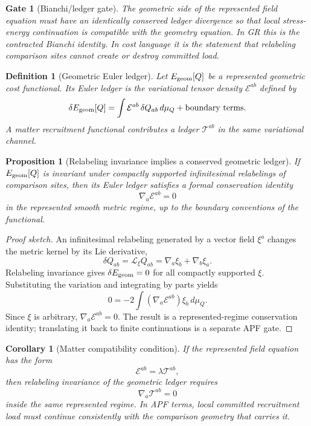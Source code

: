 \documentclass[11pt]{article}
\newtheorem{proposition}[theorem]{Proposition}
\newtheorem{corollary}[theorem]{Corollary}
\newtheorem{definition}[theorem]{Definition}
\newtheorem{gate}[theorem]{Gate}
\theoremstyle{remark}
\newcommand{\Egeom}{E_{\rm geom}}
\newcommand{\Lie}{\mathcal L}
\begin{document}
\begin{gate}[Bianchi/ledger gate]
The geometric side of the represented field equation must have an identically conserved ledger divergence so that local stress-energy continuation is compatible with the geometry equation.  In GR this is the contracted Bianchi identity.  In cost language it is the statement that relabeling comparison sites cannot create or destroy committed load.
\end{gate}


\begin{definition}[Geometric Euler ledger]
Let \(\Egeom[Q]\) be a represented geometric cost functional.  Its Euler ledger is the variational tensor density \(\mathcal E^{ab}\) defined by
\[
        \delta \Egeom[Q]
        =\int \mathcal E^{ab}\,\delta Q_{ab}\,d\mu_Q
        +\text{boundary terms}.
\]
A matter recruitment functional contributes a ledger \(\mathcal T^{ab}\) in the same variational channel.
\end{definition}

\begin{proposition}[Relabeling invariance implies a conserved geometric ledger]
\label{prop:ledger-identity}
If \(\Egeom[Q]\) is invariant under compactly supported infinitesimal relabelings of comparison sites, then its Euler ledger satisfies a formal conservation identity
\[
        \nabla_a\mathcal E^{ab}=0
\]
in the represented smooth metric regime, up to the boundary conventions of the functional.
\end{proposition}

\begin{proof}[Proof sketch]
An infinitesimal relabeling generated by a vector field \(\xi^a\) changes the metric kernel by its Lie derivative,
\[
        \delta Q_{ab}=\Lie_\xi Q_{ab}=\nabla_a\xi_b+\nabla_b\xi_a.
\]
Relabeling invariance gives \(\delta\Egeom=0\) for all compactly supported \(\xi\).  Substituting the variation and integrating by parts yields
\[
        0=-2\int (\nabla_a\mathcal E^{ab})\xi_b\,d\mu_Q.
\]
Since \(\xi\) is arbitrary, \(\nabla_a\mathcal E^{ab}=0\).  The result is a represented-regime conservation identity; translating it back to finite continuations is a separate APF gate.
\end{proof}

\begin{corollary}[Matter compatibility condition]
If the represented field equation has the form
\[
        \mathcal E^{ab}=\lambda \mathcal T^{ab},
\]
then relabeling invariance of the geometric ledger requires
\[
        \nabla_a\mathcal T^{ab}=0
\]
inside the same represented regime.  In APF terms, local committed recruitment load must continue consistently with the comparison geometry that carries it.
\end{corollary}
\end{document}
